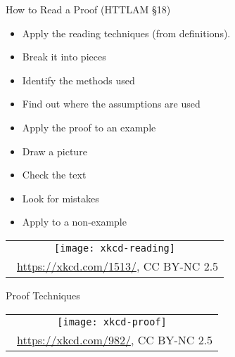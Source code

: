 \documentclass[../slides.tex]{subfiles}
\begin{document}
\begin{frame}{How to Read a Proof (HTTLAM \S18)}

	\begin{itemize}
	
		\item Apply the reading techniques (from definitions).
		
		\item Break it into pieces
		
		\item Identify the methods used
		
		\item Find out where the assumptions are used
		
		\item Apply the proof to an example
		
		\item Draw a picture
		
		\item Check the text
		
		\item Look for mistakes
		
		\item Apply to a non-example

	\end{itemize}

\begin{center}
		\begin{tabular}{c}
		\texttt{[image: xkcd-reading]}\\[-1ex]
		{\tiny \textcopyright~\url{https://xkcd.com/1513/}, CC BY-NC 2.5}
		\end{tabular}
		\end{center}

\end{frame}

\begin{frame}{Proof Techniques}

\begin{center}

\begin{tabular}{c}
		\texttt{[image: xkcd-proof]}\\[-1ex]
		{\tiny \textcopyright~\url{https://xkcd.com/982/}, CC BY-NC 2.5}
		\end{tabular}
		\end{center}

\end{frame}
\end{document}
